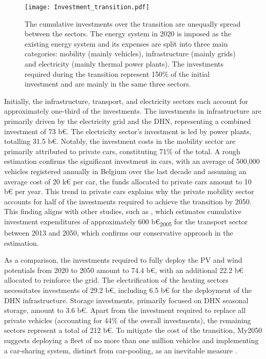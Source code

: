 \begin{figure}[!htbp]
\centering
\texttt{[image: Investment\_transition.pdf]}
\caption{The cumulative investments over the transition are unequally spread between the sectors. The energy system in 2020 is imposed as the existing energy system and its expenses are split into three main categories: mobility (mainly vehicles), infrastructure (mainly grids) and electricity (mainly thermal power plants). The investments required during the transition represent 150\% of the initial investment and are mainly in the same three sectors. }
\label{fig:pestd_cumul_inv}
\end{figure}

Initially, the infrastructure, transport, and electricity sectors each account for approximately one-third of the investments. The investments in infrastructure are primarily driven by the electricity grid and the \acrfull{DHN}, representing a combined investment of 73 b€. The electricity sector's investment is led by power plants, totalling 31.5 b€. Notably, the investment costs in the mobility sector are primarily attributed to private cars, constituting 71\% of the total. A rough estimation confirms the significant investment in cars, with an average of 500,000 vehicles registered annually in Belgium over the last decade \cite{febiac2021datadigest} and assuming an average cost of 20 k€ per car, the funds allocated to private cars amount to 10 b€ per year. This trend in private cars explains why the private mobility sector accounts for half of the investments required to achieve the transition by 2050. This finding aligns with other studies, such as \citet{Devogelaer2013}, which estimates cumulative investment expenditures of approximately 600 b€\textsubscript{2005} for the transport sector between 2013 and 2050, which confirms our conservative approach in the estimation.


As a comparison, the investments required to fully deploy the PV and wind potentials from 2020 to 2050 amount to 74.4 b€, with an additional 22.2 b€ allocated to reinforce the grid. The electrification of the heating sectors necessitates investments of 29.2 b€, including 6.5 b€ for the deployment of the \gls{DHN} infrastructure. Storage investments, primarily focused on \gls{DHN} seasonal storage, amount to 3.6 b€. Apart from the investment required to replace all private vehicles (accounting for 44\% of the overall investments), the remaining sectors represent a total of 212 b€. To mitigate the cost of the transition, My2050 suggests deploying a fleet of no more than one million vehicles and implementing a car-sharing system, distinct from car-pooling, as an inevitable measure \cite{My2050}.

